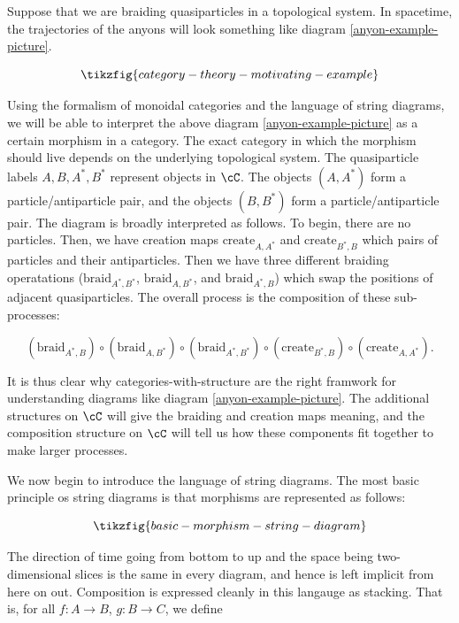 \begin{ex} Suppose that we are braiding quasiparticles in a topological system. In spacetime, the trajectories of the anyons will look something like diagram \ref{anyon-example-picture}. 

\begin{equation}\label{anyon-example-picture}
\tikzfig{category-theory-motivating-example}
\end{equation}

Using the formalism of monoidal categories and the language of string diagrams, we will be able to interpret the above diagram \ref{anyon-example-picture} as a certain morphism in a category. The exact category in which the morphism should live depends on the underlying topological system. The quasiparticle labels $A,B,A^*,B^*$ represent objects in $\cC$.  The objects $(A,A^*)$ form a particle/antiparticle pair, and the objects $(B,B^*)$ form a particle/antiparticle pair. The diagram is broadly interpreted as follows. To begin, there are no particles. Then, we have creation maps $\text{create}_{A,A^*}$ and $\text{create}_{B^*,B}$ which pairs of particles and their antiparticles. Then we have three different braiding operatations ($\text{braid}_{A^*,B^*}$, $\text{braid}_{A,B^*}$, and $\text{braid}_{A^*,B}$) which swap the positions of adjacent quasiparticles. The overall process is the composition of these sub-processes:

$$(\text{braid}_{A^*,B})\circ (\text{braid}_{A,B^*})\circ (\text{braid}_{A^*,B^*}) \circ (\text{create}_{B^*,B})\circ (\text{create}_{A,A^*}).$$

It is thus clear why categories-with-structure are the right framwork for understanding diagrams like diagram \ref{anyon-example-picture}. The additional structures on $\cC$ will give the braiding and creation maps meaning, and the composition structure on $\cC$ will tell us how these components fit together to make larger processes.
\end{ex}

We now begin to introduce the language of string diagrams. The most basic principle os string diagrams is that morphisms are represented as follows:

\begin{equation*}
\tikzfig{basic-morphism-string-diagram}
\end{equation*}

The direction of time going from bottom to up and the space being two-dimensional slices is the same in every diagram, and hence is left implicit from here on out. Composition is expressed cleanly in this langauge as stacking. That is, for all $f:A\to B$, $g:B\to C$, we define

